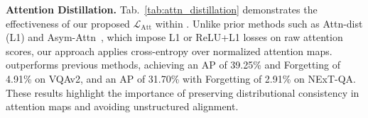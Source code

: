 \noindent {} \textbf{Attention Distillation. }Tab.~\ref{tab:attn_distillation} demonstrates the effectiveness of our proposed {$\mathcal{L}_{\text{Att}}$} within \qstmethodshort{}. Unlike prior methods such as Attn-dist (L1) and Asym-Attn~\citep{pelosin2022towards}, which impose L1 or ReLU+L1 losses on raw attention scores, our approach applies cross-entropy over normalized attention maps. \qstmethodshort{} outperforms previous methods, achieving an AP of 39.25\% and Forgetting of 4.91\% on VQAv2, and an AP of 31.70\% with Forgetting of 2.91\% on NExT-QA. These results highlight the importance of preserving distributional consistency in attention maps and avoiding unstructured alignment.
\begin{table}[t]
    \centering
    \caption{Ablation study of \qstmethodshort{} components on VQAv2 and NExT-QA.}
    \renewcommand{\arraystretch}{1.2}
    \setlength{\tabcolsep}{8pt}
    \vspace{-3mm}
    \label{tab:comparison_distillation}
\end{table}
\begin{table}[t]
    \centering
    \caption{Comparison of attention distillation methods.}
    \renewcommand{\arraystretch}{1.2}
    \setlength{\tabcolsep}{8pt}
    \label{tab:attn_distillation}
\end{table}

